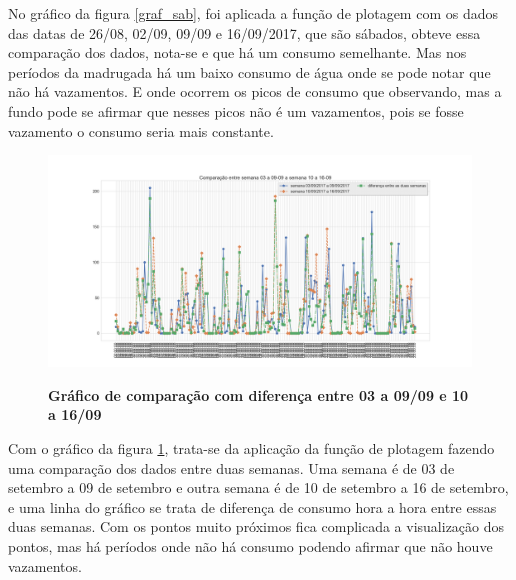 \par No gráfico da figura \ref{graf_sab}, foi aplicada a função de plotagem com os dados das datas  de 26/08, 02/09, 09/09 e 16/09/2017, que são sábados, obteve essa comparação dos dados, nota-se e que há um consumo semelhante. Mas nos períodos da madrugada há um baixo consumo de água onde se pode notar que não há vazamentos. E onde ocorrem os picos de consumo que observando, mas a fundo pode se afirmar que nesses picos não é um vazamentos, pois se fosse vazamento o consumo seria mais constante.

\begin{figure}[ht]
	\caption{\textbf{Gráfico de comparação com diferença entre 03 a 09/09 e 10 a 16/09}}
	\centering
		\includegraphics[width=\textwidth,height=\textheight , keepaspectratio]{figuras/comparacaoentresemana03a09-09asemana10a16-09}
		\label{graf_semana03a09}
\end{figure}
\par Com o gráfico da figura \ref{graf_semana03a09}, trata-se da aplicação da função de plotagem fazendo uma comparação dos dados entre duas semanas. Uma semana é de 03 de setembro a 09 de setembro e outra semana é de 10 de setembro a 16 de setembro, e uma linha do gráfico se trata de diferença de consumo hora a hora entre essas duas semanas. Com os pontos muito próximos fica complicada a visualização dos pontos, mas há períodos onde não há consumo podendo afirmar que não houve vazamentos.

